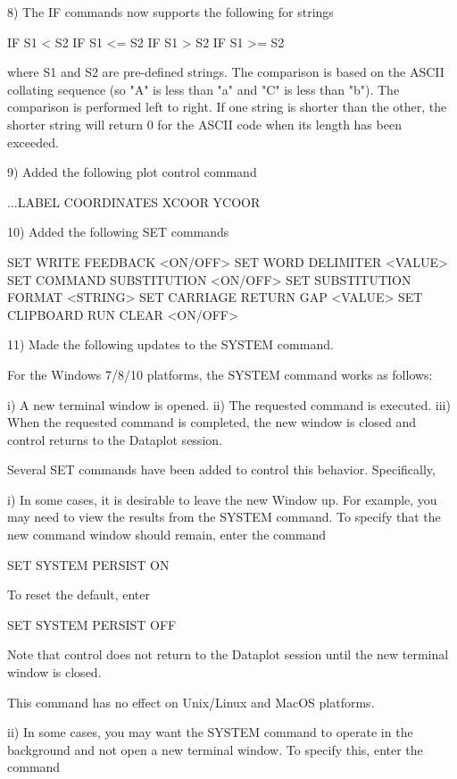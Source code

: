  8) The IF commands now supports the following for strings

        IF S1 <  S2
        IF S1 <= S2
        IF S1 >  S2
        IF S1 >= S2

     where S1 and S2 are pre-defined strings.  The comparison is based
     on the ASCII collating sequence (so "A" is less than "a" and "C" is
     less than  "b").  The comparison is performed left to right.  If
     one string is shorter than the other, the shorter string will
     return 0 for the ASCII code when its length has been exceeded.

 9) Added the following plot control command

        ...LABEL COORDINATES XCOOR YCOOR

10) Added the following SET commands

       SET WRITE FEEDBACK <ON/OFF>
       SET WORD DELIMITER <VALUE>
       SET COMMAND SUBSTITUTION <ON/OFF>
       SET SUBSTITUTION FORMAT <STRING>
       SET CARRIAGE RETURN GAP <VALUE>
       SET CLIPBOARD RUN CLEAR <ON/OFF>

11) Made the following updates to the SYSTEM command.

    For the Windows 7/8/10 platforms, the SYSTEM command works
    as follows:

      i) A new terminal window is opened.
     ii) The requested command is executed.
    iii) When the requested command is completed, the new window is
         closed and control returns to the Dataplot session.

    Several SET commands have been added to control this behavior.
    Specifically,

      i) In some cases, it is desirable to leave the new Window up.
         For example, you may need to view the results from the
         SYSTEM command.  To specify that the new command window
         should remain, enter the command

              SET SYSTEM PERSIST ON

         To reset the default, enter

              SET SYSTEM PERSIST OFF

         Note that control does not return to the Dataplot session
         until the new terminal window is closed.

         This command has no effect on Unix/Linux and MacOS platforms.

     ii) In some cases, you may want the SYSTEM command to operate in
         the background and not open a new terminal window.  To specify
         this, enter the command

